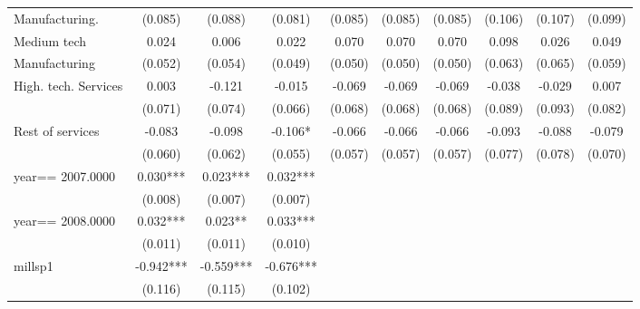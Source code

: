 \begin{table}[htbp]
\begin{tabular}{l*{9}{c}}
Manufacturing.      &     (0.085)   &     (0.088)   &     (0.081)   &     (0.085)   &     (0.085)   &     (0.085)   &     (0.106)   &     (0.107)   &     (0.099)   \\
Medium tech         &       0.024   &       0.006   &       0.022   &       0.070   &       0.070   &       0.070   &       0.098   &       0.026   &       0.049   \\
Manufacturing       &     (0.052)   &     (0.054)   &     (0.049)   &     (0.050)   &     (0.050)   &     (0.050)   &     (0.063)   &     (0.065)   &     (0.059)   \\
High. tech. Services&       0.003   &      -0.121   &      -0.015   &      -0.069   &      -0.069   &      -0.069   &      -0.038   &      -0.029   &       0.007   \\
                    &     (0.071)   &     (0.074)   &     (0.066)   &     (0.068)   &     (0.068)   &     (0.068)   &     (0.089)   &     (0.093)   &     (0.082)   \\
Rest of services    &      -0.083   &      -0.098   &      -0.106*  &      -0.066   &      -0.066   &      -0.066   &      -0.093   &      -0.088   &      -0.079   \\
                    &     (0.060)   &     (0.062)   &     (0.055)   &     (0.057)   &     (0.057)   &     (0.057)   &     (0.077)   &     (0.078)   &     (0.070)   \\
year==  2007.0000   &       0.030***&       0.023***&       0.032***&               &               &               &               &               &               \\
                    &     (0.008)   &     (0.007)   &     (0.007)   &               &               &               &               &               &               \\
year==  2008.0000   &       0.032***&       0.023** &       0.033***&               &               &               &               &               &               \\
                    &     (0.011)   &     (0.011)   &     (0.010)   &               &               &               &               &               &               \\
millsp1             &      -0.942***&      -0.559***&      -0.676***&               &               &               &               &               &               \\
                    &     (0.116)   &     (0.115)   &     (0.102)   &               &               &               &               &               &               \\

\end{tabular}
\end{table}
